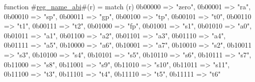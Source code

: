 function #\hyperref[sailRISCVzregzynamezyabi]{reg\_name\_abi}#(r) = {
  match (r) {
    0b00000 => "zero",
    0b00001 => "ra",
    0b00010 => "sp",
    0b00011 => "gp",
    0b00100 => "tp",
    0b00101 => "t0",
    0b00110 => "t1",
    0b00111 => "t2",
    0b01000 => "fp",
    0b01001 => "s1",
    0b01010 => "a0",
    0b01011 => "a1",
    0b01100 => "a2",
    0b01101 => "a3",
    0b01110 => "a4",
    0b01111 => "a5",
    0b10000 => "a6",
    0b10001 => "a7",
    0b10010 => "s2",
    0b10011 => "s3",
    0b10100 => "s4",
    0b10101 => "s5",
    0b10110 => "s6",
    0b10111 => "s7",
    0b11000 => "s8",
    0b11001 => "s9",
    0b11010 => "s10",
    0b11011 => "s11",
    0b11100 => "t3",
    0b11101 => "t4",
    0b11110 => "t5",
    0b11111 => "t6"
  }
}
